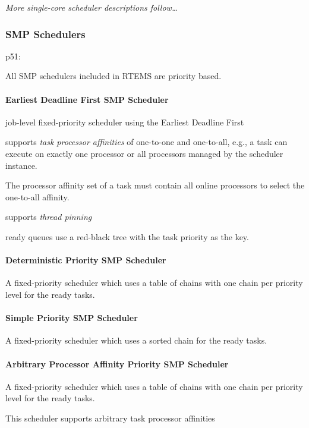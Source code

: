 \textit{More single-core scheduler descriptions follow\dots}

\subsubsection{SMP Schedulers}

p51:

All SMP schedulers included in RTEMS are priority based.

\paragraph{Earliest Deadline First SMP Scheduler}

job-level fixed-priority scheduler using the Earliest Deadline First

supports \emph{task processor affinities}
of one-to-one and one-to-all, e.g., a task can execute on exactly one processor
or all processors managed by the scheduler instance.

The processor affinity set of a task must
contain all online processors to select the one-to-all affinity.

supports \emph{thread pinning}

ready queues use a red-black tree with the task priority as the key.

\paragraph{Deterministic Priority SMP Scheduler}

A fixed-priority scheduler which uses a table of chains
with one chain per priority level for the ready tasks.

\paragraph{Simple Priority SMP Scheduler}

A fixed-priority scheduler which uses a sorted chain for the ready tasks.

\paragraph{Arbitrary Processor Affinity Priority SMP Scheduler}

A fixed-priority scheduler which uses a table of chains with one chain per priority level for the
ready tasks.

This scheduler supports arbitrary task processor affinities
